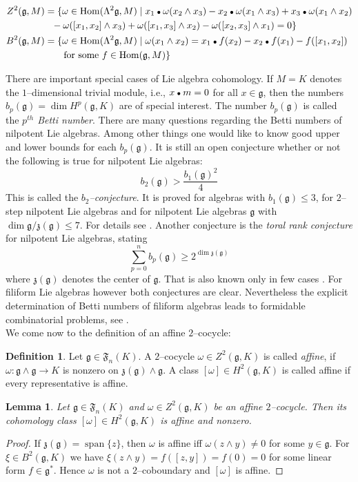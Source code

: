 \documentclass[12pt]{amsart}
\newtheorem{lem}[thm]{Lemma}
\theoremstyle{definition}
\newtheorem{defi}[thm]{Definition}
\theoremstyle{remark}
\DeclareMathOperator{\s}{span}
\DeclareMathOperator{\Hom}{Hom}
\newcommand{\pkt}{\mathbin{\raise0pt\hbox{$\scriptstyle\bullet$}}}
\newcommand{\Lg}{\mathfrak{g}}
\newcommand{\Lz}{\mathfrak{z}}
\newcommand{\LF}{\mathfrak{F}}
\newcommand{\om}{\omega}
\begin{document}
\begin{equation*}
\begin{split}
Z^2(\Lg,M) & =\{ \om \in \Hom(\Lambda^2 \Lg,M) \mid x_1\pkt \om
(x_2\wedge x_3)-
x_2\pkt \om (x_1\wedge x_3)+x_3\pkt \om (x_1\wedge x_2)\\
 & \hskip0.25 cm -\om ([x_1,x_2]\wedge x_3) + \om ([x_1,x_3]\wedge x_2) -
\om ([x_2,x_3]\wedge x_1)=0 \}\\
B^2(\Lg,M) & =\{ \om \in \Hom(\Lambda^2\Lg,M) \mid \om (x_1\wedge x_2)=x_1\pkt
f(x_2)-x_2\pkt f(x_1)-f([x_1,x_2])\\
 & \qquad \mbox{for some } f\in \Hom (\Lg,M)\}
\end{split}
\end{equation*}

There are important special cases of Lie algebra cohomology.
If $M=K$ denotes the $1$--dimensional trivial module, i.e., $x\pkt m=0$
for all $x\in\Lg$, then the numbers $b_p(\Lg)=\dim H^p(\Lg,K)$ are of special
interest. The number $b_p(\Lg)$ is called the {\it $p^{th}$ Betti number}.
There are many questions regarding the Betti numbers of nilpotent Lie algebras.
Among other things one would like to know good upper and lower bounds for each $b_p(\Lg)$.
It is still an open conjecture whether or not the following is true for
nilpotent Lie algebras:
$$b_2(\Lg) > \frac{b_1(\Lg)^2}{4}$$
This is called the {\it $b_2$--conjecture}. It is
proved for algebras with $b_1(\Lg)\le 3$, for $2$--step nilpotent Lie algebras
and for nilpotent Lie algebras $\Lg$ with
$ \dim \Lg /\Lz (\Lg) \le 7$. For details see \cite{CJP}.
Another conjecture is the {\it toral rank conjecture} for nilpotent
Lie algebras, stating
\begin{equation*}
\sum_{p=0}^n b_p(\Lg)\ge 2^{\dim \Lz(\Lg)}
\end{equation*}
where $\Lz(\Lg)$ denotes the center of $\Lg$. That is
also known only in few cases \cite{CJ}. For filiform
Lie algebras however both conjectures are clear. Nevertheless the
explicit determination of Betti numbers of filiform algebras 
leads to formidable combinatorial problems, see \cite{AS}. \\[0.3cm]
We come now to the definition of an affine $2$--cocycle:

\begin{defi}
Let $\Lg\in \LF_n(K)$. A $2$--cocycle $\om\in Z^2(\Lg,K)$
is called {\it affine}, if $\om : \Lg \wedge \Lg \rightarrow K$ is nonzero
on $\Lz (\Lg) \wedge \Lg$. A class $[\om]\in H^2(\Lg,K)$ is called
affine if every representative is affine.
\end{defi}
\begin{lem}
Let $\Lg\in \LF_n(K)$ and $\om\in Z^2(\Lg,K)$ be an affine $2$--cocycle.
Then its cohomology class $[\om]\in H^2(\Lg,K)$ is affine and nonzero.
\end{lem}
\begin{proof}
If $\Lz(\Lg)=\s \{z\}$, then $\om$ is affine iff $\om(z\wedge y)\ne 0$ for
some $y\in \Lg$. For $\xi \in B^2(\Lg,K)$ we have $\xi(z\wedge y)=f([z,y])=
f(0)=0$ for some linear form $f\in \Lg^*$. Hence $\om$ is not a
$2$--coboundary and $[\om]$ is affine.
\end{proof}
\end{document}
